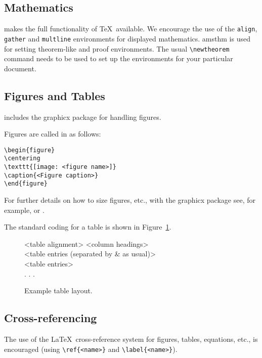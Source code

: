 \documentclass[times]{TRR}
\begin{document}
\subsection{Mathematics} \textsf{\journalclass} makes the full
functionality of \AmS\/\TeX\ available. We encourage the use of
the \verb"align", \verb"gather" and \verb"multline" environments
for displayed mathematics. \textsf{amsthm} is used for setting
theorem-like and proof environments. The usual \verb"\newtheorem"
command needs to be used to set up the environments for your
particular document.

\subsection{Figures and Tables} \textsf{\journalclass} includes the
\textsf{graphicx} package for handling figures.

Figures are called in as follows:
\begin{verbatim}
\begin{figure}
\centering
\texttt{[image: <figure name>]}
\caption{<Figure caption>}
\end{figure}
\end{verbatim}

For further details on how to size figures, etc., with the
\textsf{graphicx} package see, for example, \cite{R1}
or \cite{R3}.

The standard coding for a table is shown in Figure~\ref{F2}.

\begin{figure}
\setlength{\fboxsep}{0pt}%
\setlength{\fboxrule}{0pt}%
\begin{center}
\begin{boxedverbatim}
\begin{table}
\small\sf\centering
\caption{<Table caption>}
\begin{tabular}{<table alignment>}
\toprule
<column headings>\\
\midrule
<table entries
(separated by & as usual)>\\
<table entries>\\
.
.
.\\
\bottomrule
\end{tabular}
\end{table}
\end{boxedverbatim}
\end{center}
\caption{Example table layout.\label{F2}}
\end{figure}

\subsection{Cross-referencing}
The use of the \LaTeX\ cross-reference system
for figures, tables, equations, etc., is encouraged
(using \verb"\ref{<name>}" and \verb"\label{<name>}").
\end{document}
